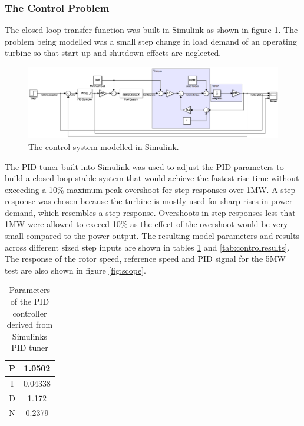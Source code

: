\documentclass[11pt, oneside]{article}
\begin{document}
 \begin{landscape}
\subsubsection{The Control Problem}
The closed loop transfer function was built in Simulink as shown in figure \ref{fig:controlsimulink}. The problem being modelled was a  small step change in load demand of an operating turbine so that start up and shutdown effects are neglected. 
\begin{figure} [h]
\centering
\includegraphics[width=1\textwidth]{./pictures/controlsimulink.png}
 \caption{The control system modelled in Simulink.} \label{fig:controlsimulink} 
 \end{figure}
 The PID tuner built into Simulink was used to adjust the PID parameters to build a closed loop stable system that would achieve the fastest rise time without exceeding a 10\% maximum peak overshoot for step responses over 1MW. A step response was chosen because the turbine is mostly used for sharp rises in power demand, which resembles a step response. Overshoots in step responses less that 1MW were allowed to exceed 10\% as the effect of the overshoot would be very small compared to the power output. The resulting model parameters and results across different sized step inputs are shown in tables \ref{tab:PID} and \ref{tab:controlresults}. The response of the rotor speed, reference speed and PID signal for the 5MW test are also shown in figure \ref{fig:scope}. 
 \end{landscape}

 \begin {table} [h]
\begin{center}
\caption{Parameters of the PID controller derived from Simulinks PID tuner} \label{tab:PID} 
\begin{tabular}{ |c|c| }
 \hline
  P & 1.0502\\ 
 \hline
  I & 0.04338\\ 
  \hline
  D & 1.172\\ 
 \hline
 N & 0.2379\\
 \hline
\end{tabular}
\end{center}  
\end {table}
\end{document}
